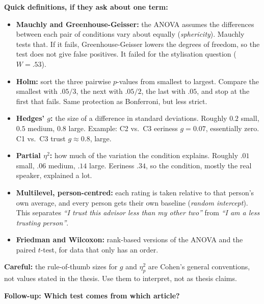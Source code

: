 \documentclass[11pt,a4paper]{article}
\newcommand{\careful}[1]{{\color{knred}\textbf{Careful:} #1}\par}
\begin{document}
\textbf{Quick definitions, if they ask about one term:}
\begin{itemize}
  \item \textbf{Mauchly and Greenhouse-Geisser:} the ANOVA assumes the differences between each pair of conditions vary about equally (\emph{sphericity}). Mauchly tests that. If it fails, Greenhouse-Geisser lowers the degrees of freedom, so the test does not give false positives. It failed for the stylisation question ($W=.53$).
  \item \textbf{Holm:} sort the three pairwise $p$-values from smallest to largest. Compare the smallest with $.05/3$, the next with $.05/2$, the last with $.05$, and stop at the first that fails. Same protection as Bonferroni, but less strict.
  \item \textbf{Hedges' $g$:} the size of a difference in standard deviations. Roughly $0.2$ small, $0.5$ medium, $0.8$ large. Example: C2 vs.\ C3 eeriness $g=0.07$, essentially zero. C1 vs.\ C3 trust $g\approx0.8$, large.
  \item \textbf{Partial $\eta^2$:} how much of the variation the condition explains. Roughly $.01$ small, $.06$ medium, $.14$ large. Eeriness $.34$, so the condition, mostly the real speaker, explained a lot.
  \item \textbf{Multilevel, person-centred:} each rating is taken relative to that person's own average, and every person gets their own baseline (\emph{random intercept}). This separates \emph{``I trust this advisor less than my other two''} from \emph{``I am a less trusting person''}.
  \item \textbf{Friedman and Wilcoxon:} rank-based versions of the ANOVA and the paired $t$-test, for data that only has an order.
\end{itemize}
\careful{the rule-of-thumb sizes for $g$ and $\eta^2_p$ are Cohen's general conventions, not values stated in the thesis. Use them to interpret, not as thesis claims.}

{\bfseries\color{knblue}Follow-up: Which test comes from which article?}\par\vspace{0.2em}
\end{document}
